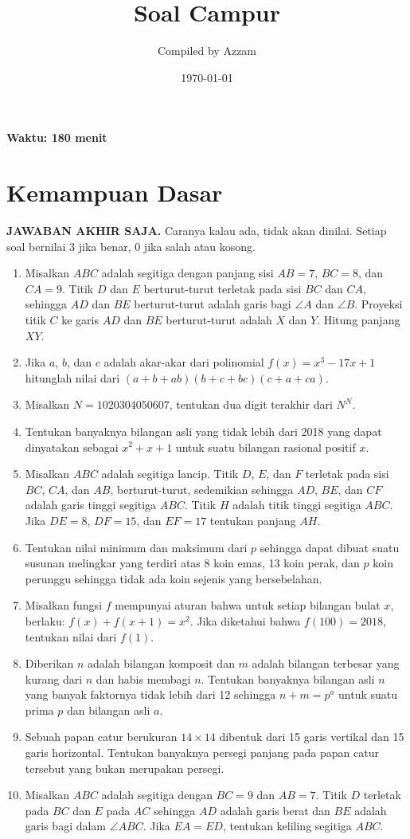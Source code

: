 \documentclass[11pt]{scrartcl}
\title{Soal Campur}
\author{Compiled by Azzam}
\date{\today}
\begin{document}
\maketitle
\textbf{Waktu: 180 menit}

\section{Kemampuan Dasar}
\textbf{JAWABAN AKHIR SAJA.} Caranya kalau ada, tidak akan dinilai. Setiap soal bernilai 3 jika benar, 0 jika salah atau kosong.
\begin{enumerate}
    \item Misalkan $ABC$ adalah segitiga dengan panjang sisi $AB = 7$, $BC = 8$, dan $CA = 9$. Titik $D$ dan $E$ berturut-turut terletak pada sisi $BC$ dan $CA$, sehingga $AD$ dan $BE$ berturut-turut adalah garis bagi $\angle A$ dan $\angle B$. Proyeksi titik $C$ ke garis $AD$ dan $BE$ berturut-turut adalah $X$ dan $Y$. Hitung panjang $XY$.
    \item Jika $a$, $b$, dan $c$ adalah akar-akar dari polinomial $f(x) = x^3 - 17x + 1$ hitunglah nilai dari $(a + b + ab)(b + c + bc)(c + a + ca)$.
    \item Misalkan $N = 1020304050607$, tentukan dua digit terakhir dari $N^N$.
    \item Tentukan banyaknya bilangan asli yang tidak lebih dari 2018 yang dapat dinyatakan sebagai $x^2 + x + 1$ untuk suatu bilangan rasional positif $x$.
    \item Misalkan $ABC$ adalah segitiga lancip. Titik $D$, $E$, dan $F$ terletak pada sisi $BC$, $CA$, dan $AB$, berturut-turut, sedemikian sehingga $AD$, $BE$, dan $CF$ adalah garis tinggi segitiga $ABC$. Titik $H$ adalah titik tinggi segitiga $ABC$. Jika $DE = 8$, $DF = 15$, dan $EF = 17$ tentukan panjang $AH$.
    \item Tentukan nilai minimum dan maksimum dari $p$ sehingga dapat dibuat suatu susunan melingkar yang terdiri atas 8 koin emas, 13 koin perak, dan $p$ koin perunggu sehingga tidak ada koin sejenis yang bersebelahan.
    \item Misalkan fungsi $f$ mempunyai aturan bahwa untuk setiap bilangan bulat $x$, berlaku: $f(x) + f(x + 1) = x^2$. Jika diketahui bahwa $f(100) = 2018$, tentukan nilai dari $f(1)$.
    \item Diberikan $n$ adalah bilangan komposit dan $m$ adalah bilangan terbesar yang kurang dari $n$ dan habis membagi $n$. Tentukan banyaknya bilangan asli $n$ yang banyak faktornya tidak lebih dari 12 sehingga $n + m = p^a$ untuk suatu prima $p$ dan bilangan asli $a$.
    \item Sebuah papan catur berukuran $14 \times 14$ dibentuk dari 15 garis vertikal dan 15 garis horizontal. Tentukan banyaknya persegi panjang pada papan catur tersebut yang bukan merupakan persegi.
    \item Misalkan $ABC$ adalah segitiga dengan $BC = 9$ dan $AB = 7$. Titik $D$ terletak pada $BC$ dan $E$ pada $AC$ sehingga $AD$ adalah garis berat dan $BE$ adalah garis bagi dalam $\angle ABC$. Jika $EA = ED$, tentukan keliling segitiga $ABC$.

\end{enumerate}
\end{document}
